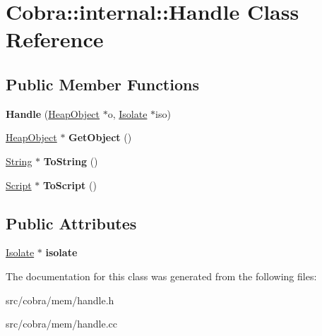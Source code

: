 \hypertarget{class_cobra_1_1internal_1_1_handle}{\section{Cobra\+:\+:internal\+:\+:Handle Class Reference}
\label{class_cobra_1_1internal_1_1_handle}
}
\subsection*{Public Member Functions}
\begin{DoxyCompactItemize}
\item 
\hypertarget{class_cobra_1_1internal_1_1_handle_a299b00917e337ed2f98da1a37adf8ef4}{{\bfseries Handle} (\hyperlink{struct_cobra_1_1internal_1_1_heap_object}{Heap\+Object} $\ast$o, \hyperlink{class_cobra_1_1internal_1_1_isolate}{Isolate} $\ast$iso)}\label{class_cobra_1_1internal_1_1_handle_a299b00917e337ed2f98da1a37adf8ef4}

\item 
\hypertarget{class_cobra_1_1internal_1_1_handle_a73e7eec02b0364ff8b93d058262858f9}{\hyperlink{struct_cobra_1_1internal_1_1_heap_object}{Heap\+Object} $\ast$ {\bfseries Get\+Object} ()}\label{class_cobra_1_1internal_1_1_handle_a73e7eec02b0364ff8b93d058262858f9}

\item 
\hypertarget{class_cobra_1_1internal_1_1_handle_ab41a1526137640b18e2c6f2da297a80a}{\hyperlink{class_cobra_1_1internal_1_1_string}{String} $\ast$ {\bfseries To\+String} ()}\label{class_cobra_1_1internal_1_1_handle_ab41a1526137640b18e2c6f2da297a80a}

\item 
\hypertarget{class_cobra_1_1internal_1_1_handle_a8373f2edb1922a2da2c5b62ae6f700af}{\hyperlink{class_cobra_1_1internal_1_1_script}{Script} $\ast$ {\bfseries To\+Script} ()}\label{class_cobra_1_1internal_1_1_handle_a8373f2edb1922a2da2c5b62ae6f700af}

\end{DoxyCompactItemize}
\subsection*{Public Attributes}
\begin{DoxyCompactItemize}
\item 
\hypertarget{class_cobra_1_1internal_1_1_handle_a1e0b8e3eeffa8d7e9fd85ae2f3559aa7}{\hyperlink{class_cobra_1_1internal_1_1_isolate}{Isolate} $\ast$ {\bfseries isolate}}\label{class_cobra_1_1internal_1_1_handle_a1e0b8e3eeffa8d7e9fd85ae2f3559aa7}

\end{DoxyCompactItemize}


The documentation for this class was generated from the following files\+:\begin{DoxyCompactItemize}
\item 
src/cobra/mem/handle.\+h\item 
src/cobra/mem/handle.\+cc\end{DoxyCompactItemize}

